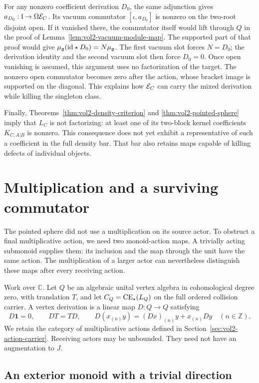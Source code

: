 For any nonzero coefficient derivation $D_0$, the same adjunction
gives $a_{D_0}:\mathfrak l\to\Omega\mathcal E_C$.
Its vacuum commutator $[\iota,a_{D_0}]$ is nonzero on the
two-root disjoint open.
If it vanished there, the commutator itself would lift through
$Q$ in the proof of Lemma~\ref{lem:vol2-vacuum-module-map}.
The supported part of that proof would give
$\mu_{\mathfrak g}(\mathrm{id}\star D_0)=N\mu_{\mathfrak g}$.
The first vacuum slot forces $N=D_0$; the derivation identity
and the second vacuum slot then force $D_0=0$.
Once open vanishing is assumed, this argument uses no
factorization of the target.
The nonzero open commutator becomes zero after the action,
whose bracket image is supported on the diagonal.
This explains how $\mathcal E_C$ can carry the mixed derivation
while killing the singleton class.

Finally, Theorems~\ref{thm:vol2-density-criterion} and
\ref{thm:vol2-pointed-sphere} imply that $L_C$ is not factorizing:
at least one of its two-block kernel coefficients $K_{C,A|B}$ is
nonzero. This consequence does not yet exhibit a representative
of such a coefficient in the full density bar. That bar also
retains maps capable of killing defects of individual objects.

\section{Multiplication and a surviving commutator}
\label{sec:vol2-monoid-obstruction}

The pointed sphere did not use a multiplication on its source
actor. To obstruct a final multiplicative action, we need two
monoid-action maps. A trivially acting submonoid supplies them:
its inclusion and the map through the unit have the same action.
The multiplication of a larger actor can nevertheless distinguish
these maps after every receiving action.

Work over $\mathbb C$. Let $Q$ be an algebraic unital vertex algebra
in cohomological degree zero, with translation $T$, and let
$C_Q=\operatorname{CE}_{\star}(L_Q)$ on the full ordered collision carrier.
A vertex derivation is a linear map $D:Q\to Q$ satisfying
\[
 D\mathbf1=0,\qquad DT=TD,\qquad
 D(x_{(n)}y)=(Dx)_{(n)}y+x_{(n)}Dy\quad(n\in\mathbb Z).
\]
We retain the category of multiplicative actions defined in
Section~\ref{sec:vol2-action-carrier}. Receiving actors may be
unbounded. They need not have an augmentation to $J$.

\subsection{An exterior monoid with a trivial direction}

